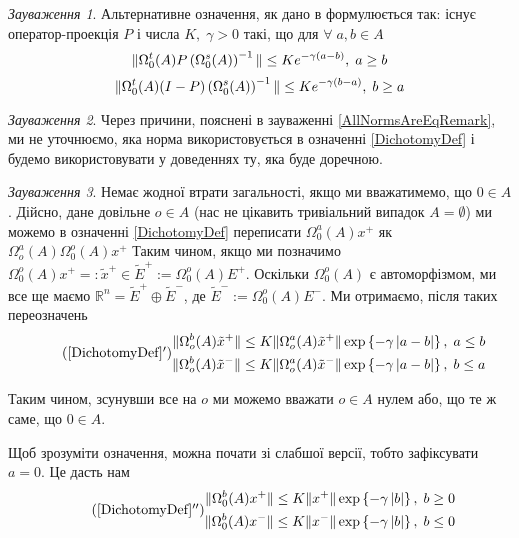 \documentclass[14pt]{extarticle} %
\let\oldforall\forall
\renewcommand{\forall}{\oldforall\;}
\theoremstyle{remark}
\newtheorem{remark}{Зауваження}
\begin{document}
\begin{remark}Альтернативне означення, як дано в \cite{coppel} формулюється так: існує оператор-проекція $P$ і числа $K,\;\gamma>0$ такі, що
	для $\forall a,b\in A$
	\[\|\Omega_0^t(A)P\left(\Omega_0^s(A)\right)^{-1}\|\leq K e^{-\gamma(a-b)},\;a\geq b\]
	\[\|\Omega_0^t(A)(I-P)\left(\Omega_0^s(A)\right)^{-1}\|\leq K e^{-\gamma(b-a)},\;b\geq a\]
\end{remark}
\begin{remark}
	Через причини, пояснені в зауваженні \ref{AllNormsAreEqRemark}, ми не уточнюємо, яка норма використовується в означенні
	\ref{DichotomyDef} і будемо використовувати у доведеннях ту, яка буде доречною.
\end{remark}
\begin{remark}
Немає жодної втрати загальності, якщо ми вважатимемо, що $0\in A$. Дійсно, дане довільне $o\in A$ (нас не цікавить тривіальний
випадок $A=\emptyset$) ми можемо в означенні \ref{DichotomyDef} переписати $\Omega_0^a(A)x^+$ як $\Omega_o^a(A)\Omega_0^o(A)x^+$
Таким чином, якщо ми позначимо $\Omega_0^o(A)x^+=:\tilde{x}^+\in \tilde{E}^+:=\Omega_0^o(A)E^+$. Оскільки $\Omega_0^o(A)$ є автоморфізмом,
ми все ще маємо $\mathbb{R}^n=\tilde{E}^+\oplus \tilde{E}^-$, де $\tilde{E}^-:=\Omega_0^o(A)E^-$. Ми отримаємо, після таких переозначень
\begin{equation*}
	\tag{\ref*{DichotomyDef}$'$}
	\begin{aligned}
	\mynorm{\Omega^b_o(A)\tilde{x}^+}\leq K\mynorm{\Omega_o^a(A)\tilde{x}^+}\exp\left\{-\gamma\myabs{a-b}\right\},\;a\leq b\\
	\mynorm{\Omega^b_o(A)\tilde{x}^-}\leq K\mynorm{\Omega_o^a(A)\tilde{x}^-}\exp\left\{-\gamma\myabs{a-b}\right\},\;b\leq a\\
\end{aligned}\end{equation*}

Таким чином, зсунувши все на $o$ ми можемо вважати $o\in A$ нулем або, що те ж саме, що $0\in A$.

Щоб зрозуміти означення, можна почати зі слабшої версії, тобто зафіксувати $a=0$. Це дасть нам
\begin{equation*}
	\tag{\ref*{DichotomyDef}$''$}
	\begin{aligned}
	\mynorm{\Omega^b_0(A){x}^+}\leq K\mynorm{{x}^+}\exp\left\{-\gamma\myabs{b}\right\},\; b\geq 0\\
	\mynorm{\Omega^b_0(A){x}^-}\leq K\mynorm{{x}^-}\exp\left\{-\gamma\myabs{b}\right\},\;b\leq 0\\
\end{aligned}\end{equation*}


\end{remark}
\end{document}
